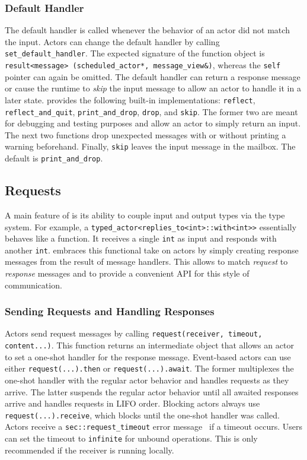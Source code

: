 \subsubsection{Default Handler}
\label{default-handler}

The default handler is called whenever the behavior of an actor did not match the input. Actors can change the default handler by calling \lstinline^set_default_handler^. The expected signature of the function object is \lstinline^result<message> (scheduled_actor*, message_view&)^, whereas the \lstinline^self^ pointer can again be omitted. The default handler can return a response message or cause the runtime to \emph{skip} the input message to allow an actor to handle it in a later state. \lib provides the following built-in implementations: \lstinline^reflect^, \lstinline^reflect_and_quit^, \lstinline^print_and_drop^, \lstinline^drop^, and \lstinline^skip^. The former two are meant for debugging and testing purposes and allow an actor to simply return an input. The next two functions drop unexpected messages with or without printing a warning beforehand. Finally, \lstinline^skip^ leaves the input message in the mailbox. The default is \lstinline^print_and_drop^.

\subsection{Requests}
\label{request}

A main feature of \lib is its ability to couple input and output types via the type system. For example, a \lstinline^typed_actor<replies_to<int>::with<int>>^ essentially behaves like a function. It receives a single \lstinline^int^ as input and responds with another \lstinline^int^. \lib embraces this functional take on actors by simply creating response messages from the result of message handlers. This allows \lib to match \emph{request} to \emph{response} messages and to provide a convenient API for this style of communication.

\subsubsection{Sending Requests and Handling Responses}
\label{handling-response}

Actors send request messages by calling \lstinline^request(receiver, timeout, content...)^. This function returns an intermediate object that allows an actor to set a one-shot handler for the response message. Event-based actors can use either \lstinline^request(...).then^ or \lstinline^request(...).await^. The former multiplexes the one-shot handler with the regular actor behavior and handles requests as they arrive. The latter suspends the regular actor behavior until all awaited responses arrive and handles requests in LIFO order. Blocking actors always use \lstinline^request(...).receive^, which blocks until the one-shot handler was called. Actors receive a \lstinline^sec::request_timeout^  error message~ if a timeout occurs. Users can set the timeout to \lstinline^infinite^ for unbound operations. This is only recommended if the receiver is running locally.

